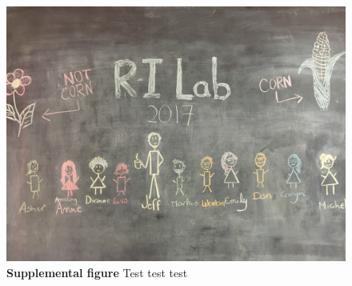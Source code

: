 \documentclass[article,9pt,twocolumn,twoside]{rilabRxiv}
\newcommand{\beginsupplement}{%
        \setcounter{table}{0}
        \renewcommand{\thetable}{S\arabic{table}}%
        \setcounter{figure}{0}
        \renewcommand{\thefigure}{S\arabic{figure}}%
     }
\begin{document}
\beginsupplement


\blindtext
\begin{figure}[h!]
\includegraphics[width=.9\linewidth]{figures/lab_group.png}
\caption{\textbf{Supplemental figure} Test test test}
\label{fig:S1}
\end{figure}
\pagebreak
\end{document}
